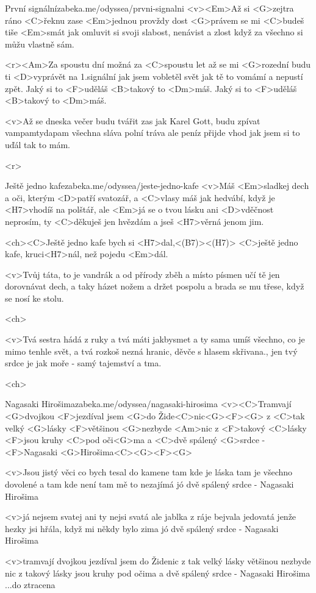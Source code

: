 \begin{song}[Chinaski]{7}{První signální}{zabeka.me/odyssea/prvni-signalni}
	<v><Em>Až si <G>zejtra ráno <C>řeknu zase
	<Em>jednou provždy dost
	<G>právem se mi <C>budeš tiše <Em>smát
	jak omluvit si svoji slabost, nenávist a zlost
	když za všechno si můžu vlastně sám.

	<r><Am>Za spoustu dní možná za <C>spoustu let
	až se mi <G>rozední budu ti <D>vyprávět
	na 1.signální jak jsem vobletěl svět
	jak tě to vomámí a nepustí zpět.
	Jaký si to <F>uděláš <B>takový to <Dm>máš.
	Jaký si to <F>uděláš <B>takový to <Dm>máš.

	<v>Až se dneska večer budu tvářit zas jak Karel Gott,
	budu zpívat vampamtydapam
	všechna sláva polní tráva ale peníz přijde vhod
	jak jsem si to uďál tak to mám.

	<r>
\end{song}
\begin{song}{8}{Ještě jedno kafe}{zabeka.me/odyssea/jeste-jedno-kafe}
	<v>Máš <Em>sladkej dech a oči, kterým <D>patří svatozář,
	a <C>vlasy máš jak hedvábí, když je <H7>vhodíš na polštář,
	ale <Em>já se o tvou lásku ani <D>vděčnost neprosím,
	ty <C>děkuješ jen hvězdám a jseš <H7>věrná jenom jim.

	<ch><C>Ještě jedno kafe bych si <H7>dal,<(B7)><(H7)>
	<C>ještě jedno kafe, kruci<H7>nál, než pojedu <Em>dál.

	<v>Tvůj táta, to je vandrák a od přírody zběh
	a místo písmen učí tě jen dorovnávat dech,
	a taky házet nožem a držet pospolu
	a brada se mu třese, když se nosí ke stolu.

	<ch>

	<v>Tvá sestra hádá z ruky a tvá máti jakbysmet
	a ty sama umíš všechno, co je mimo tenhle svět,
	a tvá rozkoš nezná hranic, děvče s hlasem skřivana.,
	jen tvý srdce je jak moře - samý tajemství a tma.

	<ch>
\end{song}
\begin{song}{9}{Nagasaki Hirošima}{zabeka.me/odyssea/nagasaki-hirosima}
	<v><C>Tramvají <G>dvojkou <F>jezdíval jsem <G>do Žide<C>nic<G><F><G>
	z <C>tak velký <G>lásky <F>většinou <G>nezbyde <Am>nic
	z <F>takový <C>lásky <F>jsou kruhy <C>pod oči<G>ma
	a <C>dvě spálený <G>srdce - <F>Nagasaki <G>Hirošima<C><G><F><G>

	<v>Jsou jistý věci co bych tesal do kamene
	tam kde je láska tam je všechno dovolené
	a tam kde není tam mě to nezajímá
	jó dvě spálený srdce - Nagasaki Hirošima

	<v>já nejsem svatej ani ty nejsi svatá
	ale jablka z ráje bejvala jedovatá
	jenže hezky jsi hřála, když mi někdy bylo zima
	jó dvě spálený srdce - Nagasaki Hirošima

	<v>tramvají dvojkou jezdíval jsem do Židenic
	z tak velký lásky většinou nezbyde nic
	z takový lásky jsou kruhy pod očima
	a dvě spálený srdce - Nagasaki Hirošima ...do ztracena
\end{song}
